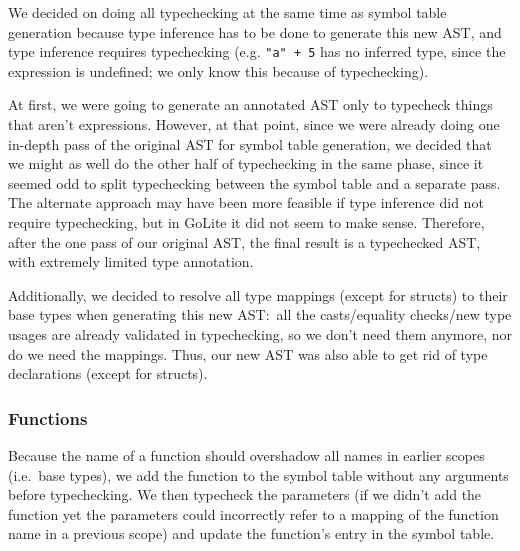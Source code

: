 \documentclass[11pt]{article}
\begin{document}
We decided on doing all typechecking at the same time as symbol table
generation because type inference has to be done to generate this new
AST, and type inference requires typechecking (e.g. \texttt{"a" + 5}
has no inferred type, since the expression is undefined; we only know
this because of typechecking).

At first, we were going to generate an annotated AST only to typecheck
things that aren't expressions. However, at that point, since we were
already doing one in-depth pass of the original AST for symbol table
generation, we decided that we might as well do the other half of
typechecking in the same phase, since it seemed odd to split
typechecking between the symbol table and a separate pass. The
alternate approach may have been more feasible if type inference did
not require typechecking, but in GoLite it did not seem to make
sense. Therefore, after the one pass of our original AST, the final
result is a typechecked AST, with extremely limited type annotation.

Additionally, we decided to resolve all type mappings (except for
structs) to their base types when generating this new AST:~all the
casts/equality checks/new type usages are already validated in
typechecking, so we don't need them anymore, nor do we need the
mappings. Thus, our new AST was also able to get rid of type
declarations (except for structs).
\subsubsection{Functions}
Because the name of a function should overshadow all names in earlier
scopes (i.e.\ base types), we add the function to the symbol table
without any arguments before typechecking. We then typecheck the
parameters (if we didn't add the function yet the parameters could
incorrectly refer to a mapping of the function name in a previous
scope) and update the function's entry in the symbol table.
\end{document}
